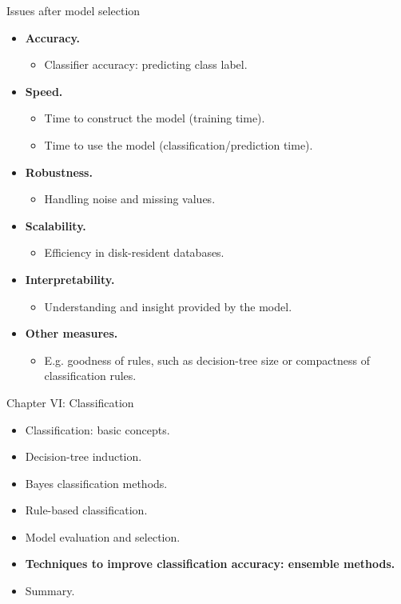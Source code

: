 \documentclass[aspectratio=169,t,table]{beamer}
\begin{document}
  {
    \begin{frame}{Issues after model selection}
      \begin{itemize}
        \item \textbf{Accuracy.}
        \begin{itemize}
          \item Classifier accuracy: predicting class label.
        \end{itemize}
        \item \textbf{Speed.}
        \begin{itemize}
          \item Time to construct the model (training time).
          \item Time to use the model (classification/prediction time).
        \end{itemize}
        \item \textbf{Robustness.}
        \begin{itemize}
          \item Handling noise and missing values.
        \end{itemize}
        \item \textbf{Scalability.}
        \begin{itemize}
          \item Efficiency in disk-resident databases.
        \end{itemize}
        \item \textbf{Interpretability.}
        \begin{itemize}
          \item Understanding and insight provided by the model.
        \end{itemize}
        \item \textbf{Other measures.}
        \begin{itemize}
          \item E.g. goodness of rules, such as decision-tree size or compactness of classification rules.
        \end{itemize}
      \end{itemize}
    \end{frame}
  }

  {
    \begin{frame}{Chapter VI: Classification}
        \begin{itemize}
            \item Classification: basic concepts.
            \item Decision-tree induction.
            \item Bayes classification methods.
            \item Rule-based classification.
            \item Model evaluation and selection.
            \item \textbf{Techniques to improve classification accuracy: ensemble methods.}
            \item Summary.
        \end{itemize}
    \end{frame}
  }
\end{document}
